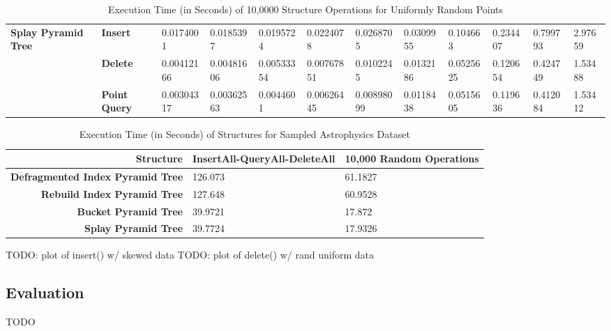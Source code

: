 \begin{landscape}
\begin{table}
\begin{tabular}{|p{2cm}|l|l|l|l|l|l|l|l|l|l|l|}
			\hline
			\multirow{ 4}{*}{\textbf{Splay Pyramid Tree}} & \textbf{Insert} & 0.0174001 & 0.0185397 & 0.0195724 & 0.0224078 & 0.0268705 & 0.0309955 & 0.104663 & 0.234407 & 0.799793 & 2.97659 \\
			 & \textbf{Delete} & 0.00412166 & 0.00481606 & 0.00533354 & 0.00767851 & 0.0102245 & 0.0132186 & 0.0525625 & 0.120654 & 0.424749 & 1.53488  \\
			 & \textbf{Point Query} & 0.00304317 & 0.00362563 & 0.0044601 & 0.00626445 & 0.00898099 & 0.0118438 & 0.0515605 & 0.119636 & 0.412084 & 1.53412 \\
			\hline
		\end{tabular}
		\caption{Execution Time (in Seconds) of 10,0000 Structure Operations for Uniformly Random Points}
		\label{tab:perf2-randuniform}
	\end{table}

	\begin{table}
		\centering
		\begin{tabular}{|r|l|l|}
			\hline
			\textbf{Structure} & \textbf{InsertAll-QueryAll-DeleteAll} & \textbf{10,000 Random Operations} \\
			\hline
			\textbf{Defragmented Index Pyramid Tree} & 126.073 & 61.1827 \\
			\textbf{Rebuild Index Pyramid Tree} & 127.648 & 60.9528 \\
			\textbf{Bucket Pyramid Tree} & 39.9721 & 17.872 \\
			\textbf{Splay Pyramid Tree} & 39.7724 & 17.9326 \\
			\hline
		\end{tabular}
		\caption{Execution Time (in Seconds) of Structures for Sampled Astrophysics Dataset}
		\label{tab:perf2-astrophysics}
	\end{table}

\end{landscape}

TODO: plot of insert() w/ skewed data
TODO: plot of delete() w/ rand uniform data

\subsection{Evaluation}

TODO
